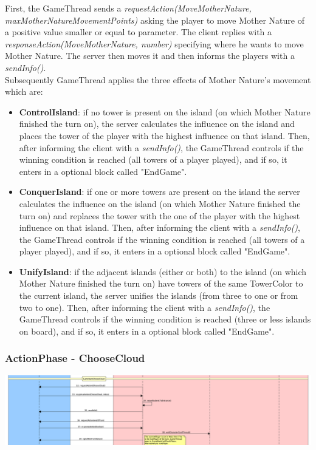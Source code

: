 \documentclass[12pt]{article}
\begin{document}
				First, the GameThread sends a \emph{requestAction(MoveMotherNature, maxMotherNatureMovementPoints)} asking the player to move Mother Nature of a positive value smaller or equal to parameter. The client replies with a \emph{responseAction(MoveMotherNature, number)} specifying where he wants to move Mother Nature. The server then moves it and then informs the players with a \emph{sendInfo()}. \\
				Subsequently GameThread applies the three effects of Mother Nature's movement which are:
				\begin{itemize}
					\item \textbf{ControlIsland}: if no tower is present on the island (on which Mother Nature finished the turn on), the server calculates the influence on the island and places the tower of the player with the highest influence on that island. Then, after informing the client with a \emph{sendInfo()}, the GameThread controls if the winning condition is reached (all towers of a player played), and if so, it enters in a optional block called "EndGame".
					\item \textbf{ConquerIsland}: if one or more towers are present on the island the server calculates the influence on the island (on which Mother Nature finished the turn on) and replaces the tower with the one of the player with the highest influence on that island. Then, after informing the client with a \emph{sendInfo()}, the GameThread controls if the winning condition is reached (all towers of a player played), and if so, it enters in a optional block called "EndGame".
					\item \textbf{UnifyIsland}: if the adjacent islands (either or both) to the island (on which Mother Nature finished the turn on) have towers of the same TowerColor to the current island, the server unifies the islands (from three to one or from two to one). Then, after informing the client with a \emph{sendInfo()}, the GameThread controls if the winning condition is reached (three or less islands on board), and if so, it enters in a optional block called "EndGame". 
				\end{itemize}
				
			\subsubsection{ActionPhase - ChooseCloud}
			
				\begin{center}
					\includegraphics[width=\textwidth,height=\textheight,keepaspectratio]{Game_4}
				\end{center}
				
\end{document}
